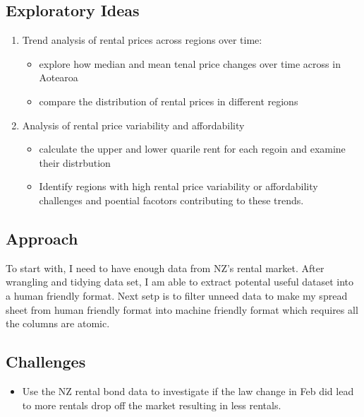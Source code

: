 \documentclass[
]{article}
\providecommand{\tightlist}{%
  \setlength{\itemsep}{0pt}\setlength{\parskip}{0pt}}
\begin{document}
\subsection{Exploratory Ideas}\label{exploratory-ideas}

\begin{enumerate}
\def\labelenumi{\arabic{enumi}.}
\tightlist
\item
  Trend analysis of rental prices across regions over time:

  \begin{itemize}
  \tightlist
  \item
    explore how median and mean tenal price changes over time across in
    Aotearoa
  \item
    compare the distribution of rental prices in different regions
  \end{itemize}
\item
  Analysis of rental price variability and affordability

  \begin{itemize}
  \tightlist
  \item
    calculate the upper and lower quarile rent for each regoin and
    examine their distrbution
  \item
    Identify regions with high rental price variability or affordability
    challenges and poential facotors contributing to these trends.
  \end{itemize}
\end{enumerate}

\subsection{Approach}\label{approach}

To start with, I need to have enough data from NZ's rental market. After
wrangling and tidying data set, I am able to extract potental useful
dataset into a human friendly format. Next setp is to filter unneed data
to make my spread sheet from human friendly format into machine friendly
format which requires all the columns are atomic.

\subsection{Challenges}\label{challenges}

\begin{itemize}
\tightlist
\item
  Use the NZ rental bond data to investigate if the law change in Feb
  did lead to more rentals drop off the market resulting in less
  rentals.
\end{itemize}
\end{document}
